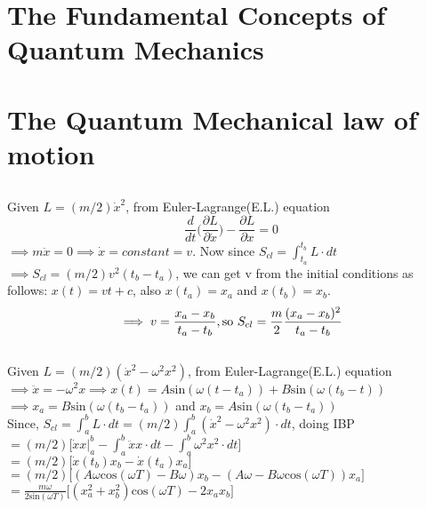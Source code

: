 \documentclass[a4paper, 12pt]{article}
\begin{document}
\section {{\large{\textbf{The Fundamental Concepts of Quantum Mechanics}}}}
\section {{\large{\textbf{The Quantum Mechanical law of motion}}}}

\subsection {}%
Given $L = (m/2)\dot{x}^2$, from Euler-Lagrange(E.L.) equation 
$$\frac{d}{dt}\bigg(\frac{\partial L}{\partial \dot{x}}\bigg) - \frac{\partial L}{\partial x} =0$$
$\implies m\ddot{x} = 0 \implies \dot{x} = constant = v$. Now since $S_{cl}=\int_{t_a}^{t_b} L \cdot dt $ \\$\implies S_{cl}= (m/2)v^2 (t_b -t_a)$, we can get v from the initial conditions as follows:
$x(t) = vt + c$, also $x(t_a)=x_a $ and $ x(t_b)=x_b$.\\
$$\implies v = \frac{x_a - x_b}{t_a - t_b} \mathrm{,so }\*\ S_{cl} = \frac{m}{2}\frac{(x_a-x_b)^2}{t_a-t_b}$$

\subsection {}%
Given $L = (m/2)(\dot{x}^2 -\omega^2 x^2)$, from Euler-Lagrange(E.L.) equation \\
$\implies \ddot{x} = -\omega^2 x \implies x(t)= A \mathrm{sin}(\omega(t-t_a)) + B\mathrm{sin}(\omega(t_b-t) ) $\\
$\implies x_a = B\mathrm{sin}(\omega(t_b-t_a))$ and $x_b = A \mathrm{sin}(\omega(t_b-t_a))$\\
Since, $S_{cl}=\int_{a}^{b} L \cdot dt =(m/2) \int_{a}^{b}(\dot{x}^2 -\omega^2 x^2)\cdot dt$, doing IBP\\
$=(m/2) \Big[ \dot{x}x|_a^b -\int_{a}^{b}\ddot{x}x \cdot dt -\int_{a}^{b}\omega^2 x^2 \cdot dt \Big]$\\
$=(m/2)\Big[\dot{x}(t_b)x_b - \dot{x}(t_a)x_a\Big]$\\
$=(m/2)\Big[(A\omega \mathrm{cos}(\omega T)-B\omega)x_b -(A\omega-B\omega\mathrm{cos}(\omega T))x_a \Big]$\\
$=\frac{m\omega}{2\mathrm{sin}(\omega T)}\Big[(x_a^2 +x_b^2)\mathrm{cos}(\omega T) -2x_ax_b \Big]$
\end{document}
